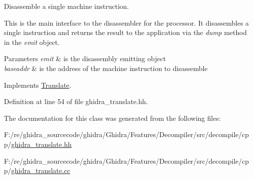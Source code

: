 Disassemble a single machine instruction. 

This is the main interface to the disassembler for the processor. It disassembles a single instruction and returns the result to the application via the {\itshape dump} method in the {\itshape emit} object. 
\begin{DoxyParams}{Parameters}
{\em emit} & is the disassembly emitting object \\
\hline
{\em baseaddr} & is the address of the machine instruction to disassemble \\
\hline
\end{DoxyParams}


Implements \mbox{\hyperlink{class_translate_ac97443bb89e0c6bfb68caf9f48a8c85d}{Translate}}.



Definition at line 54 of file ghidra\+\_\+translate.\+hh.



The documentation for this class was generated from the following files\+:\begin{DoxyCompactItemize}
\item 
F\+:/re/ghidra\+\_\+sourcecode/ghidra/\+Ghidra/\+Features/\+Decompiler/src/decompile/cpp/\mbox{\hyperlink{ghidra__translate_8hh}{ghidra\+\_\+translate.\+hh}}\item 
F\+:/re/ghidra\+\_\+sourcecode/ghidra/\+Ghidra/\+Features/\+Decompiler/src/decompile/cpp/\mbox{\hyperlink{ghidra__translate_8cc}{ghidra\+\_\+translate.\+cc}}\end{DoxyCompactItemize}
